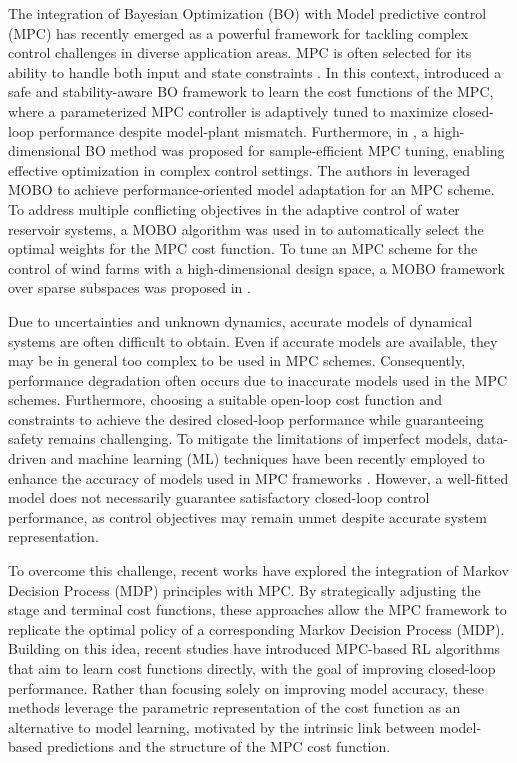 \documentclass[10pt,twocolumn,twoside]{IEEEtran}
\begin{document}
The integration of Bayesian Optimization (BO) with Model predictive control (MPC) has recently emerged as a powerful framework for tackling complex control challenges in diverse application areas. MPC is often selected for its ability to handle both input and state constraints \cite{rawling}. In this context, \cite{HIRT2024208} introduced a safe and stability-aware BO framework to learn the cost functions of the MPC, where a parameterized MPC controller is adaptively tuned to maximize closed-loop performance despite model-plant mismatch. Furthermore, in \cite{KUDVA2024458}, a high-dimensional BO method was proposed for sample-efficient MPC tuning, enabling effective optimization in complex control settings. The authors in \cite{mobo3} leveraged MOBO to achieve performance-oriented model adaptation for an MPC scheme. To address multiple conflicting objectives in the adaptive control of water reservoir systems, a MOBO algorithm was used in \cite{mobo4} to automatically select the optimal weights for the MPC cost function. To tune an MPC scheme for the control of wind farms with a high-dimensional design space, a MOBO framework over sparse subspaces was proposed in \cite{mobo5}.

Due to uncertainties and unknown dynamics, accurate models of dynamical systems are often difficult to obtain. Even if accurate models are available, they may be in general too complex to be used in MPC schemes. Consequently, performance degradation often occurs due to inaccurate models used in the MPC schemes. Furthermore, choosing a suitable open-loop cost function and constraints to achieve the desired closed-loop performance while guaranteeing safety remains challenging. To mitigate the limitations of imperfect models, data-driven and machine learning (ML) techniques have been recently employed to enhance the accuracy of models used in MPC frameworks \cite{8909368,MullerAllgower2021,muntwiler22a,KARG2021107266}. However, a well-fitted model does not necessarily guarantee satisfactory closed-loop control performance, as control objectives may remain unmet despite accurate system representation. 

To overcome this challenge, recent works \cite{10808167,8701462,10542325,10644368} have explored the integration of Markov Decision Process (MDP) principles with MPC. By strategically adjusting the stage and terminal cost functions, these approaches allow the MPC framework to replicate the optimal policy of a corresponding Markov Decision Process (MDP). Building on this idea, recent studies have introduced MPC-based RL algorithms that aim to learn cost functions directly, with the goal of improving closed-loop performance. Rather than focusing solely on improving model accuracy, these methods leverage the parametric representation of the cost function as an alternative to model learning, motivated by the intrinsic link between model-based predictions and the structure of the MPC cost function.
\end{document}
